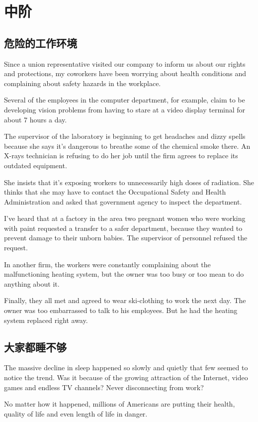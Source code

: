 \newpage
\section{中阶}
\setcounter{subsection}{18}
\subsection{危险的工作环境}
Since a union representative visited our company to inform
us about our rights and protections, my coworkers
have been worrying about health conditions and complaining
about safety hazards in the workplace.

Several of the employees in the computer department,
for example, claim to be developing vision problems from
having to stare at a video display terminal for about 7
hours a day.

The supervisor of the laboratory is beginning to get headaches
and dizzy spells because she says it's dangerous to
breathe some of the chemical smoke there. An X-rays
technician is refusing to do her job until the firm agrees to
replace its outdated equipment.

She insists that it's exposing workers to unnecessarily high
doses of radiation. She thinks that she may have to contact
the Occupational Safety and Health Administration
and asked that government agency to inspect the department.

I've heard that at a factory in the area two pregnant
women who were working with paint requested a transfer
to a safer department, because they wanted to prevent
damage to their unborn babies. The supervisor of personnel
refused the request.

In another firm, the workers were constantly complaining
about the malfunctioning heating system, but the
owner was too busy or too mean to do anything about it.

Finally, they all met and agreed to wear ski-clothing to
work the next day. The owner was too embarrassed to talk
to his employees. But he had the heating system replaced
right away.
\subsection{大家都睡不够}
The massive decline in sleep happened so slowly and quietly
that few seemed to notice the trend. Was it because
of the growing attraction of the Internet, video games and
endless TV channels? Never disconnecting from work?

No matter how it happened, millions of Americans are
putting their health, quality of life and even length of life in
danger.

